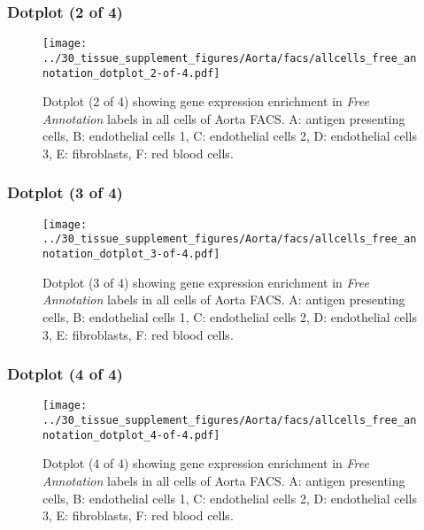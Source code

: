 \clearpage

\subsubsection{Dotplot (2 of 4)}
\begin{figure}[h]
\centering
\texttt{[image: ../30\_tissue\_supplement\_figures/Aorta/facs/allcells\_free\_annotation\_dotplot\_2-of-4.pdf]}

\caption{ Dotplot (2 of 4)  showing gene expression enrichment in \emph{Free Annotation} labels in all cells of Aorta FACS. A: antigen presenting cells, B: endothelial cells 1, C: endothelial cells 2, D: endothelial cells 3, E: fibroblasts, F: red blood cells.}
\end{figure}


\clearpage

\subsubsection{Dotplot (3 of 4)}
\begin{figure}[h]
\centering
\texttt{[image: ../30\_tissue\_supplement\_figures/Aorta/facs/allcells\_free\_annotation\_dotplot\_3-of-4.pdf]}

\caption{ Dotplot (3 of 4)  showing gene expression enrichment in \emph{Free Annotation} labels in all cells of Aorta FACS. A: antigen presenting cells, B: endothelial cells 1, C: endothelial cells 2, D: endothelial cells 3, E: fibroblasts, F: red blood cells.}
\end{figure}


\clearpage

\subsubsection{Dotplot (4 of 4)}
\begin{figure}[h]
\centering
\texttt{[image: ../30\_tissue\_supplement\_figures/Aorta/facs/allcells\_free\_annotation\_dotplot\_4-of-4.pdf]}

\caption{ Dotplot (4 of 4)  showing gene expression enrichment in \emph{Free Annotation} labels in all cells of Aorta FACS. A: antigen presenting cells, B: endothelial cells 1, C: endothelial cells 2, D: endothelial cells 3, E: fibroblasts, F: red blood cells.}
\end{figure}

